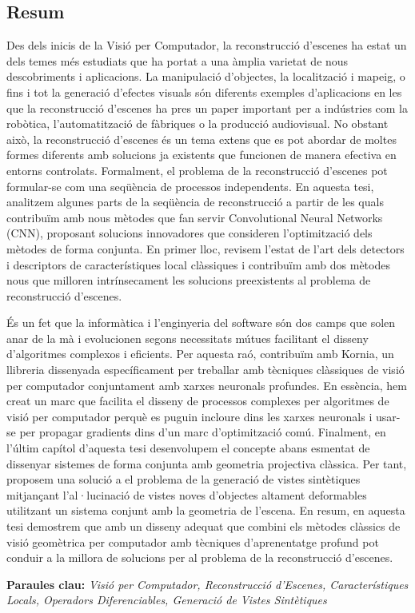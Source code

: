 \begin{otherlanguage}{catalan}
\cleardoublepage
\chapter*{Resum}
\vspace{-24mm}

Des dels inicis de la Visió per Computador, la reconstrucció d'escenes ha estat un dels temes més estudiats que ha portat a una àmplia varietat de nous descobriments i aplicacions. La manipulació d'objectes, la localització i mapeig, o fins i tot la generació d'efectes visuals són diferents exemples d'aplicacions en les que la reconstrucció d'escenes ha pres un paper important per a indústries com la robòtica, l'automatització de fàbriques o la producció audiovisual. No obstant això, la reconstrucció d'escenes és un tema extens que es pot abordar de moltes formes diferents amb solucions ja existents que funcionen de manera efectiva en entorns controlats. Formalment, el problema de la reconstrucció d'escenes pot formular-se com una seqüència de processos independents. En aquesta tesi, analitzem algunes parts de la seqüència de reconstrucció a partir de les quals contribuïm amb nous mètodes que fan servir Convolutional Neural Networks (CNN), proposant solucions innovadores que consideren l’optimització dels mètodes de forma conjunta. En primer lloc, revisem l'estat de l'art dels detectors i descriptors de característiques local clàssiques i contribuïm amb dos mètodes nous que milloren intrínsecament les solucions preexistents al problema de reconstrucció d'escenes.

És un fet que la informàtica i l'enginyeria del software són dos camps que solen anar de la mà i evolucionen segons necessitats mútues facilitant el disseny d'algoritmes complexos i eficients. Per aquesta raó, contribuïm amb Kornia, un llibreria dissenyada específicament per treballar amb tècniques clàssiques de visió per computador conjuntament amb xarxes neuronals profundes. En essència, hem creat un marc que facilita el disseny de processos complexes per algoritmes de visió per computador perquè es puguin incloure dins les xarxes neuronals i usar-se per propagar gradients dins d'un marc d'optimització comú. Finalment, en l'últim capítol d'aquesta tesi desenvolupem el concepte abans esmentat de dissenyar sistemes de forma conjunta amb geometria projectiva clàssica. Per tant, proposem una solució a el problema de la generació de vistes sintètiques mitjançant l'al·lucinació de vistes noves d'objectes altament deformables utilitzant un sistema conjunt amb la geometria de l'escena. En resum, en aquesta tesi demostrem que amb un disseny adequat que combini els mètodes clàssics de visió geomètrica per computador amb tècniques d'aprenentatge profund pot conduir a la millora de solucions per al problema de la reconstrucció d'escenes.

\vspace{1mm}
\textbf{Paraules clau:} \textit{Visió per Computador, Reconstrucció d'Escenes, Característiques Locals, Operadors Diferenciables, Generació de Vistes Sintètiques}


\end{otherlanguage}

